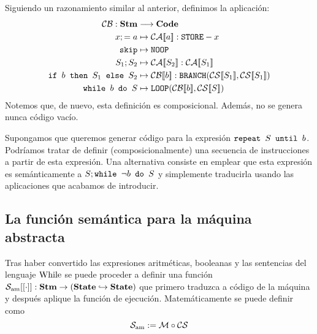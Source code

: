 Siguiendo un razonamiento similar al anterior, definimos la aplicación:
\begin{align*}
    \mc{CB}: \mathbf{Stm} &\longrightarrow\mathbf{Code}\\
    x;=a &\mapsto \fc{CA}{a}:\n{STORE}-x\\
    \n{skip} &\mapsto \n{NOOP}\\
    S_1;S_2&\mapsto \fc{CA}{S_2}:\fc{CA}{S_1}\\
    \n{if }b\n{ then } S_1 \n{ else }S_2&\mapsto \fc{CB}{b}:\n{BRANCH}(\fc{CS}{S_1}, \fc{CS}{S_1})\\
    \n{while }b\n{ do }S&\mapsto \n{LOOP}(\fc{CB}{b}, \fc{CS}{S})
\end{align*}
Notemos que, de nuevo, esta definición es composicional. Además, no se genera nunca código vacío. 

\begin{example}
Supongamos que queremos generar código para la expresión $\texttt{repeat }S \texttt{ until }b$. Podríamos tratar de definir (composicionalmente) una secuencia de instrucciones a partir de esta expresión. Una alternativa consiste en emplear que esta expresión es semánticamente a $S; \texttt{while }\neg b \texttt{ do }S$ y simplemente traducirla usando las aplicaciones que acabamos de introducir.
\end{example}

\subsection{La función semántica para la máquina abstracta}
Tras haber convertido las expresiones aritméticas, booleanas y las sentencias del lenguaje $\mathrm{While}$ se puede proceder a definir una función $\mathcal{S}_{\mathrm{am}}[[\cdot]]: \textbf{Stm}\to (\textbf{State} \hookrightarrow \textbf{State})$ que primero traduzca a código de la máquina y después aplique la función de ejecución. Matemáticamente se puede definir como
\[
    \mathcal{S}_{\mathrm{am}} := \mathcal{M}\circ \mathcal{CS}
\]


